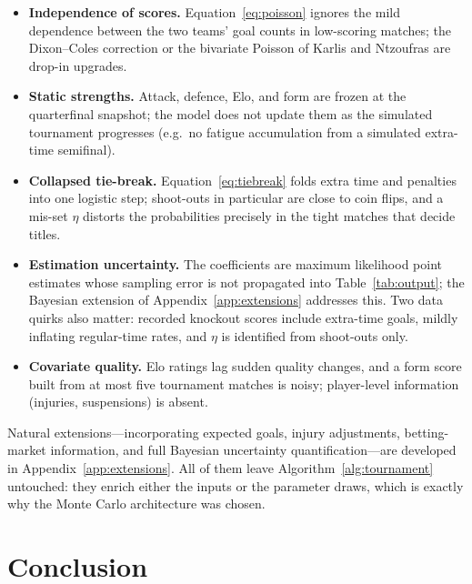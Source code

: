 \documentclass[11pt]{article}
\begin{document}
\begin{itemize}
  \item \textbf{Independence of scores.} Equation~\eqref{eq:poisson} ignores
        the mild dependence between the two teams' goal counts in
        low-scoring matches; the Dixon--Coles correction
        \cite{dixon1997modelling} or the bivariate Poisson of Karlis and
        Ntzoufras \cite{karlis2003analysis} are drop-in upgrades.
  \item \textbf{Static strengths.} Attack, defence, Elo, and form are frozen
        at the quarterfinal snapshot; the model does not update them as the
        simulated tournament progresses (e.g.\ no fatigue accumulation from a
        simulated extra-time semifinal).
  \item \textbf{Collapsed tie-break.} Equation~\eqref{eq:tiebreak} folds
        extra time and penalties into one logistic step; shoot-outs in
        particular are close to coin flips, and a mis-set $\eta$ distorts the
        probabilities precisely in the tight matches that decide titles.
  \item \textbf{Estimation uncertainty.} The coefficients are maximum
        likelihood point estimates whose sampling error is not propagated
        into Table~\ref{tab:output}; the Bayesian extension of
        Appendix~\ref{app:extensions} addresses this. Two data quirks also
        matter: recorded knockout scores include extra-time goals, mildly
        inflating regular-time rates, and $\eta$ is identified from
        shoot-outs only.
  \item \textbf{Covariate quality.} Elo ratings lag sudden quality changes,
        and a form score built from at most five tournament matches is
        noisy; player-level information (injuries, suspensions) is absent.
\end{itemize}

Natural extensions---incorporating expected goals, injury adjustments,
betting-market information, and full Bayesian uncertainty
quantification---are developed in Appendix~\ref{app:extensions}. All of them
leave Algorithm~\ref{alg:tournament} untouched: they enrich either the inputs
or the parameter draws, which is exactly why the Monte Carlo architecture was
chosen.

\section{Conclusion}
\label{sec:conclusion}
\end{document}
